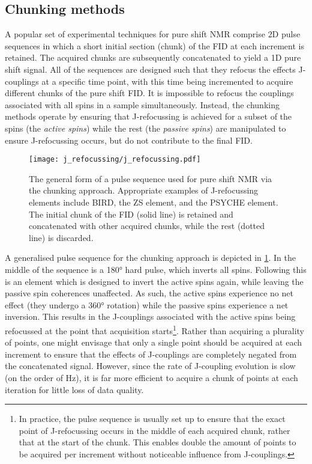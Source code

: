 \subsection{Chunking methods}
A popular set of experimental techniques for pure shift \ac{NMR} comprise
\ac{2D} pulse sequences in which a short initial section (chunk) of the
\ac{FID} at each increment is retained\cite{Adams2014}. The acquired chunks are
subsequently concatenated to yield a \ac{1D} pure shift signal.  All of the
sequences are designed such that they refocus the effects J-couplings at a
specific time point, with this time being incremented to acquire
different chunks of the pure shift \ac{FID}. It is impossible to refocus the
couplings associated with all spins in a sample simultaneously. Instead, the
chunking methods operate by ensuring that J-refocussing is achieved for a
subset of the spins (the \emph{active spins}) while the rest (the \emph{passive
spins}) are manipulated to ensure J-refocussing occurs, but do not contribute
to the final \ac{FID}.

\begin{figure}
    \centering
    \texttt{[image: j\_refocussing/j\_refocussing.pdf]}
    \caption[
        The general form of a pulse sequence used for pure shift \acs{NMR}
        using the chunking approach.
    ]{
        The general form of a pulse sequence used for pure shift \acs{NMR}
        via the chunking approach. Appropriate examples of J-refocussing
        elements include \acs{BIRD}, the \acl{ZS} element, and the
        \acs{PSYCHE} element. The initial chunk of the \ac{FID} (solid
        line) is retained and concatenated with other acquired chunks,
        while the rest (dotted line) is discarded.
    }
    \label{fig:j-refocussing}
\end{figure}
\makeatletter
{}
\makeatother

A generalised pulse sequence for the chunking approach is depicted in
\cref{fig:j-refocussing}. In the middle of the sequence is a \ang{180} hard
pulse, which inverts all spins. Following this is an element which is designed
to invert the active spins again, while leaving the passive spin coherences
unaffected. As such, the active spins experience no net effect (they
undergo a \ang{360} rotation) while the passive spins experience a net inversion.
This results in the J-couplings associated with the active spins being
refocussed at the point that acquisition starts\footnote{
    In practice, the pulse sequence is usually set up to ensure that the exact
    point of J-refocussing occurs in the middle of each acquired chunk, rather
    that at the start of the chunk. This enables double the amount
    of points to be acquired per increment without noticeable influence from
    J-couplings.
}.
Rather than acquiring a plurality of points, one might envisage that only a
single point should be acquired at each increment to
ensure that the effects of J-couplings are completely negated from the
concatenated signal. However, since the rate of J-coupling evolution is
slow (on the order of \unit{\hertz}), it is far more efficient to acquire a
chunk of points at each iteration for little loss of data quality.

